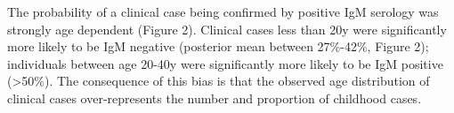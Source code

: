The probability of a clinical case being confirmed by positive IgM serology was strongly age dependent (Figure 2). Clinical cases less than 20y were significantly more likely to be IgM negative (posterior mean between 27\%-42\%, Figure 2); individuals between age 20-40y were significantly more likely to be IgM positive (\textgreater{}50\%). The consequence of this bias is that the observed age distribution of clinical cases over-represents the number and proportion of childhood cases.